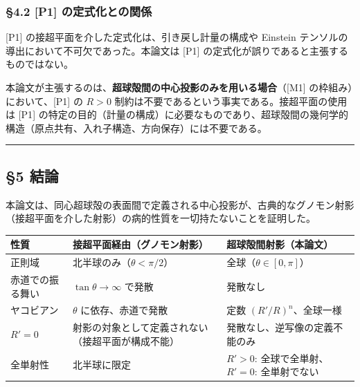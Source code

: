 \documentclass[
  a4paper]{ltjsarticle}
\newcounter{none} %
\begin{document}
\subsubsection{§4.2 {[}P1{]}
の定式化との関係}\label{p1-ux306eux5b9aux5f0fux5316ux3068ux306eux95a2ux4fc2}

{[}P1{]} の接超平面を介した定式化は、引き戻し計量の構成や Einstein
テンソルの導出において不可欠であった。本論文は {[}P1{]}
の定式化が誤りであると主張するものではない。

本論文が主張するのは、\textbf{超球殻間の中心投影のみを用いる場合}（{[}M1{]}
の枠組み）において、{[}P1{]} の \(R > 0\)
制約は不要であるという事実である。接超平面の使用は {[}P1{]}
の特定の目的（計量の構成）に必要なものであり、超球殻間の幾何学的構造（原点共有、入れ子構造、方向保存）には不要である。

\begin{center}\rule{0.5\linewidth}{0.5pt}\end{center}

\subsection{§5 結論}\label{ux7d50ux8ad6}

本論文は、同心超球殻の表面間で定義される中心投影が、古典的なグノモン射影（接超平面を介した射影）の病的性質を一切持たないことを証明した。

{\def\LTcaptype{none} %
\begin{longtable}[]{@{}
  >{\raggedright\arraybackslash}p{}
  >{\raggedright\arraybackslash}p{}
  >{\raggedright\arraybackslash}p{}@{}}
\toprule\noalign{}
\begin{minipage}[b]{\linewidth}\raggedright
性質
\end{minipage} & \begin{minipage}[b]{\linewidth}\raggedright
接超平面経由（グノモン射影）
\end{minipage} & \begin{minipage}[b]{\linewidth}\raggedright
超球殻間射影（本論文）
\end{minipage} \\
\midrule\noalign{}
\endhead
\bottomrule\noalign{}
\endlastfoot
正則域 & 北半球のみ（\(\theta < \pi/2\)） &
全球（\(\theta \in [0, \pi]\)） \\
赤道での振る舞い & \(\tan\theta \to \infty\) で発散 & 発散なし \\
ヤコビアン & \(\theta\) に依存、赤道で発散 & 定数
\((R'/R)^n\)、全球一様 \\
\(R' = 0\) & 射影の対象として定義されない（接超平面が構成不能） &
発散なし、逆写像の定義不能のみ \\
全単射性 & 北半球に限定 & \(R' > 0\): 全球で全単射、\(R' = 0\):
全単射でない \\
\end{longtable}
}
\end{document}
